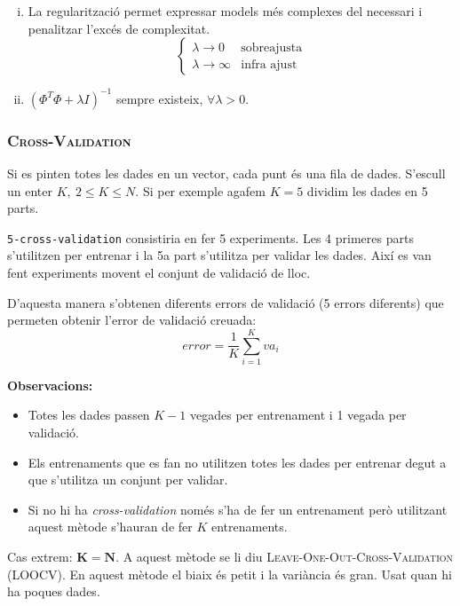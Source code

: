 \documentclass[a4paper]{article}
\begin{document}
\begin{enumerate}[i)]
	\item La regularització permet expressar models més complexes del necessari i penalitzar l'excés de complexitat.
	$$
	\begin{cases}
		\lambda \rightarrow 0 &\text{sobreajusta} \\
		\lambda \rightarrow \infty &\text{infra ajust}
	\end{cases}
	$$
	
	\item $\left( \Phi^T \Phi + \lambda I \right)^{-1}$ sempre existeix, $\forall \lambda > 0$.
\end{enumerate}

\subsubsection{\textsc{Cross-Validation}}


Si es pinten totes les dades en un vector, cada punt és una fila de dades. S'escull un enter $K, \ 2 \le K \le N$. Si per exemple agafem $K=5$ dividim les dades en 5 parts. 

\verb|5-cross-validation| consistiria en fer 5 experiments. Les 4 primeres parts s'utilitzen per entrenar i la 5a part s'utilitza per validar les dades. Així es van fent experiments movent el conjunt de validació de lloc.

D'aquesta manera s'obtenen diferents errors de validació (5 errors diferents) que permeten obtenir l'error de validació creuada:
$$
error = \frac{1}{K} \sum_{i=1}^K va_i
$$

\textbf{Observacions:}
\begin{itemize}
	\item Totes les dades passen $K - 1$ vegades per entrenament i 1 vegada per validació.
	\item Els entrenaments que es fan no utilitzen totes les dades per entrenar degut a que s'utilitza un conjunt per validar.
	\item Si no hi ha \emph{cross-validation} només s'ha de fer un entrenament però utilitzant aquest mètode s'hauran de fer $K$ entrenaments.
\end{itemize}

Cas extrem: $\boldsymbol{K=N}$. A aquest mètode se li diu \textsc{Leave-One-Out-Cross-Validation} (LOOCV). En aquest mètode el biaix és petit i la variància és gran. Usat quan hi ha poques dades.
\end{document}
